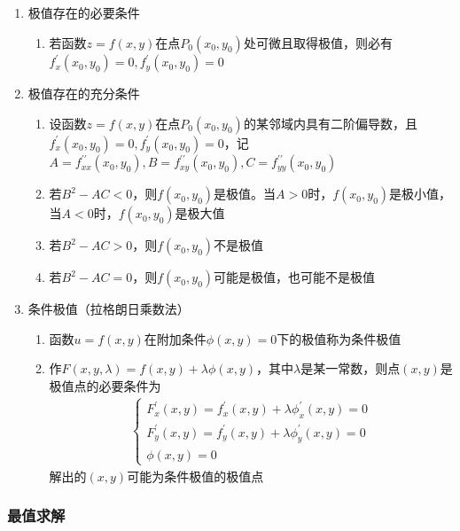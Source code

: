 \documentclass[12pt]{book}
\begin{document}
\begin{enumerate}[1.]
    \item 极值存在的必要条件
          \begin{enumerate}[1.]
              \item 若函数$z=f(x,y)$在点$P_{0}(x_0,y_0)$处可微且取得极值，则必有$f^{\prime}_{x}(x_0,y_0)=0, f^{\prime}_{y}(x_0,y_0)=0$
          \end{enumerate}
    \item 极值存在的充分条件
          \begin{enumerate}[(1)]
              \item 设函数$z=f(x,y)$在点$P_{0}(x_0,y_0)$的某邻域内具有二阶偏导数，且$f^{\prime}_{x}(x_0,y_0)=0, f^{\prime}_{y}(x_0,y_0)=0$，记$A=f^{\prime\prime}_{xx}(x_0,y_0), B=f^{\prime\prime}_{xy}(x_0,y_0), C=f^{\prime\prime}_{yy}(x_0,y_0)$
              \item 若$B^{2}-AC<0$，则$f(x_0,y_0)$是极值。当$A>0$时，$f(x_0,y_0)$是极小值，当$A<0$时，$f(x_0,y_0)$是极大值
              \item 若$B^{2}-AC>0$，则$f(x_0,y_0)$不是极值
              \item 若$B^{2}-AC=0$，则$f(x_0,y_0)$可能是极值，也可能不是极值
          \end{enumerate}
    \item 条件极值（拉格朗日乘数法）
          \begin{enumerate}[(1)]
              \item 函数$u=f(x,y)$在附加条件$\phi(x,y)=0$下的极值称为条件极值
              \item 作$F(x,y,\lambda)=f(x,y)+\lambda\phi(x,y)$，其中$\lambda$是某一常数，则点$(x,y)$是极值点的必要条件为
                    \begin{gather*}
                        \begin{cases}
                            F^{\prime}_{x}(x,y)=f^{\prime}_{x}(x,y)+\lambda\phi^{\prime}_{x}(x,y)=0 \\
                            F^{\prime}_{y}(x,y)=f^{\prime}_{y}(x,y)+\lambda\phi^{\prime}_{y}(x,y)=0 \\
                            \phi(x,y)=0
                        \end{cases}
                    \end{gather*}
                    解出的$(x,y)$可能为条件极值的极值点
          \end{enumerate}
\end{enumerate}


\subsubsection{最值求解}
\end{document}
